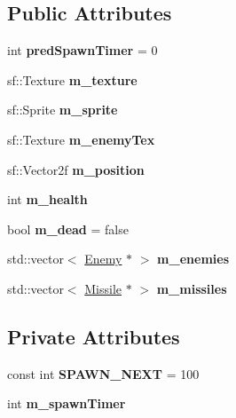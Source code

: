 \subsection*{Public Attributes}
\begin{DoxyCompactItemize}
\item 
\mbox{\label{class_nest_a3ff8fac0c765899ca495bb7f5093c3aa}} 
int {\bfseries pred\+Spawn\+Timer} = 0
\item 
\mbox{\label{class_nest_ad0ac5a094c1ba7f254b42abeab2782b2}} 
sf\+::\+Texture {\bfseries m\+\_\+texture}
\item 
\mbox{\label{class_nest_a943179818abef7612c8b01d94cca1b35}} 
sf\+::\+Sprite {\bfseries m\+\_\+sprite}
\item 
\mbox{\label{class_nest_a2ca01f7b25a686560770d9ab4ce41a9a}} 
sf\+::\+Texture {\bfseries m\+\_\+enemy\+Tex}
\item 
\mbox{\label{class_nest_a242f8fdc768bec452ad8c594020c7df6}} 
sf\+::\+Vector2f {\bfseries m\+\_\+position}
\item 
\mbox{\label{class_nest_a62458a07bccda0e3a339bc66fb46105d}} 
int {\bfseries m\+\_\+health}
\item 
\mbox{\label{class_nest_aba348c507c2842c893ce6bab11c9d0f1}} 
bool {\bfseries m\+\_\+dead} = false
\item 
\mbox{\label{class_nest_aa3e5d28a07cc30883f8d6b39e3552cd2}} 
std\+::vector$<$ \mbox{\hyperlink{class_enemy}{Enemy}} $\ast$ $>$ {\bfseries m\+\_\+enemies}
\item 
\mbox{\label{class_nest_a9894674f676fb6dc1fcf244bdcbde362}} 
std\+::vector$<$ \mbox{\hyperlink{class_missile}{Missile}} $\ast$ $>$ {\bfseries m\+\_\+missiles}
\end{DoxyCompactItemize}
\subsection*{Private Attributes}
\begin{DoxyCompactItemize}
\item 
\mbox{\label{class_nest_a5c71c1f1f949545a78b1c192d52aa8d8}} 
const int {\bfseries S\+P\+A\+W\+N\+\_\+\+N\+E\+XT} = 100
\item 
\mbox{\label{class_nest_a083513ca886fede041e1d109fdf44798}} 
int {\bfseries m\+\_\+spawn\+Timer}
\end{DoxyCompactItemize}


